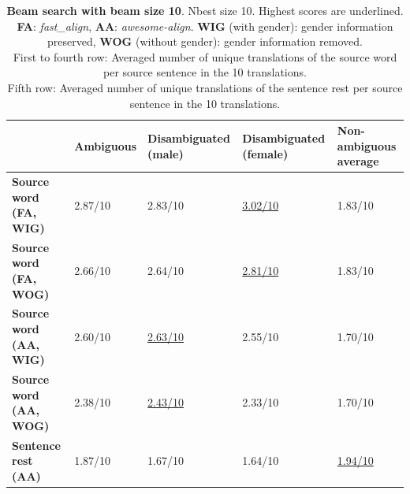 \begin{table}

    \begin{subtable}{\textwidth}
        \centering
        \begin{tabularx}{\linewidth}{|X|XXXX|}
            \hline
             & \textbf{Ambiguous} & \textbf{Disambiguated (male)} & \textbf{Disambiguated (female)} & \textbf{Non-ambiguous average} \\ \hline
             \textbf{Source word (FA, WIG)} & 2.87/10 & 2.83/10 & \underline{3.02/10} & 1.83/10 \\
             \textbf{Source word (FA, WOG)} & 2.66/10 & 2.64/10 & \underline{2.81/10} & 1.83/10 \\
             \textbf{Source word (AA, WIG)} & 2.60/10 & \underline{2.63/10} & 2.55/10 & 1.70/10 \\ 
             \textbf{Source word (AA, WOG)} & 2.38/10 & \underline{2.43/10} & 2.33/10 & 1.70/10 \\\hline 
             \textbf{Sentence rest (AA)} & 1.87/10 & 1.67/10 & 1.64/10 & \underline{1.94/10} \\ \hline
        \end{tabularx}
        \caption{\textbf{Beam search with beam size 10}. Nbest size 10. Highest scores are underlined. \\ \textbf{FA}: \textit{fast\_align}, \textbf{AA}: \textit{awesome-align}. \textbf{WIG} (with gender): gender information preserved, \textbf{WOG} (without gender): gender information removed. \\ First to fourth row: Averaged number of unique translations of the source word per source sentence in the 10 translations. \\ Fifth row: Averaged number of unique translations of the sentence rest per source sentence in the 10 translations.}
        \label{tab:alignment_translation_10}
    \end{subtable}


\end{table}

